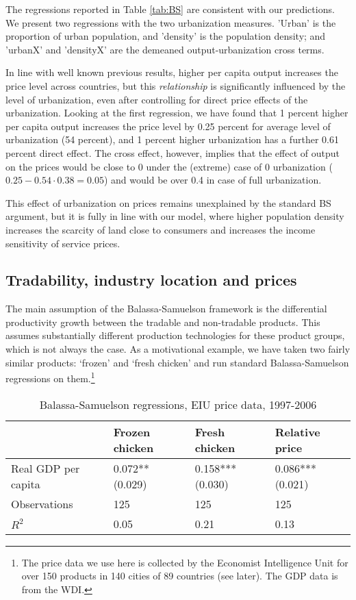 \documentclass[12pt]{article}
\begin{document}
The regressions reported in Table \ref{tab:BS} are consistent with our predictions. We present two regressions with the two urbanization measures. 'Urban' is the proportion of urban population, and 'density' is the population density; and 'urbanX' and 'densityX' are the demeaned
output-urbanization cross terms.

In line with well known previous results, higher per capita output
increases the price level across countries, but this \emph{relationship} is significantly influenced by the level of urbanization, even after controlling for direct price effects of the urbanization. Looking at the first regression, we have found that 1 percent higher per capita output increases the price level by 0.25 percent for average level of urbanization (54 percent), and 1 percent higher urbanization has a further 0.61 percent direct effect. The cross effect, however, implies that the effect of output on the prices would be close to 0 under the (extreme) case of 0 urbanization ($0.25-0.54\cdot0.38=0.05$) and would be over 0.4 in case of full urbanization.

This effect of urbanization on prices remains unexplained by the standard BS argument, but it is fully in line with our model, where higher population density increases the scarcity of land close to consumers and increases the income sensitivity of service prices.

\subsection{Tradability, industry location and prices}

The main assumption of the Balassa-Samuelson framework is the differential productivity growth between the tradable and non-tradable products. This assumes substantially different production technologies for these product groups, which is not always the case. As a motivational example, we have taken two fairly similar products: `frozen' and `fresh chicken' and run standard Balassa-Samuelson regressions on them.\footnote{The price data we use here is collected by the Economist Intelligence Unit for over 150 products in 140 cities of 89 countries (see later). The GDP data is from the WDI.}

\begin{table}[h!]
\center
\caption{Balassa-Samuelson regressions, EIU price data, 1997-2006}
\begin{tabular}{lm{5em}m{5em}m{5em}}
  \hline\hline
   & Frozen chicken & Fresh chicken & Relative price\\
   \hline
  Real GDP per capita & 0.072**   (0.029) & 0.158***   (0.030) & 0.086***   (0.021)\\
\hline
  Observations &  125 & 125 & 125
\\
  $R^2$ &  0.05& 0.21 & 0.13
\\
  \hline\hline
\end{tabular}
\end{table}
\end{document}

